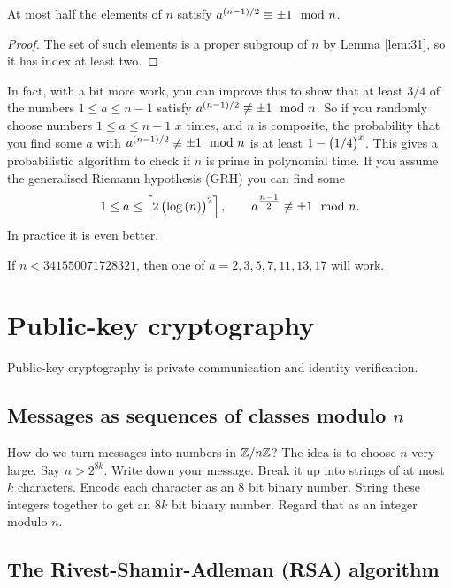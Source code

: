 \begin{corollary}
At most half the elements of $ \unit{n} $ satisfy $ a^{\br{n - 1} / 2} \equiv \pm 1 \mod n $.
\end{corollary}

\begin{proof}
The set of such elements is a proper subgroup of $ \unit{n} $ by Lemma \ref{lem:31}, so it has index at least two.
\end{proof}

In fact, with a bit more work, you can improve this to show that at least $ 3 / 4 $ of the numbers $ 1 \le a \le n - 1 $ satisfy $ a^{\br{n - 1} / 2} \not\equiv \pm 1 \mod n $. So if you randomly choose numbers $ 1 \le a \le n - 1 $ $ x $ times, and $ n $ is composite, the probability that you find some $ a $ with $ a^{\br{n - 1} / 2} \not\equiv \pm 1 \mod n $ is at least $ 1 - \br{1 / 4}^x $. This gives a probabilistic algorithm to check if $ n $ is prime in polynomial time. If you assume the generalised Riemann hypothesis (GRH) you can find some
$$ 1 \le a \le \left\lceil 2 \br{\log\br{n}}^2 \right\rceil, \qquad a^{\tfrac{n - 1}{2}} \not\equiv \pm 1 \mod n. $$
In practice it is even better.

\begin{example*}
If $ n < 341550071728321 $, then one of $ a = 2, 3, 5, 7, 11, 13, 17 $ will work.
\end{example*}

\pagebreak

\section{Public-key cryptography}

Public-key cryptography is private communication and identity verification.

\subsection{Messages as sequences of classes modulo \texorpdfstring{$ n $}{n}}

How do we turn messages into numbers in $ \mathbb{Z} / n\mathbb{Z} $? The idea is to choose $ n $ very large. Say $ n > 2^{8k} $. Write down your message. Break it up into strings of at most $ k $ characters. Encode each character as an $ 8 $ bit binary number. String these integers together to get an $ 8k $ bit binary number. Regard that as an integer modulo $ n $.

\subsection{The Rivest-Shamir-Adleman (RSA) algorithm}

